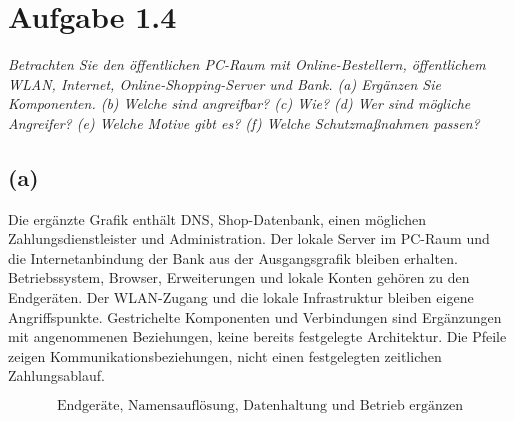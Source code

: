 \documentclass[a4paper,11pt]{article}
\newif\ifexplain
\newcommand{\aufgabe}[1]{\section*{Aufgabe #1}}
\newcommand{\angabe}[1]{\textit{#1}\par\smallskip}
\newcommand{\teil}[1]{\subsection*{(#1)}}
\newcommand{\explain}[1]{\ifexplain\begin{erklbox}#1\end{erklbox}\fi}
\newcommand{\ergebnis}[1]{\[\boxed{\text{#1}}\]}
\begin{document}
\aufgabe{1.4}
\angabe{Betrachten Sie den öffentlichen PC-Raum mit Online-Bestellern, öffentlichem WLAN, Internet,
Online-Shopping-Server und Bank. (a) Ergänzen Sie Komponenten. (b) Welche sind angreifbar?
(c) Wie? (d) Wer sind mögliche Angreifer? (e) Welche Motive gibt es? (f) Welche Schutzmaßnahmen passen?}
\teil{a}
Die ergänzte Grafik enthält DNS, Shop-Datenbank, einen möglichen Zahlungsdienstleister und Administration.
Der lokale Server im PC-Raum und die Internetanbindung der Bank aus der Ausgangsgrafik bleiben erhalten.
Betriebssystem, Browser, Erweiterungen und lokale Konten gehören zu den Endgeräten.
Der WLAN-Zugang und die lokale Infrastruktur bleiben eigene Angriffspunkte.
Gestrichelte Komponenten und Verbindungen sind Ergänzungen mit angenommenen Beziehungen, keine bereits festgelegte Architektur.
Die Pfeile zeigen Kommunikationsbeziehungen, nicht einen festgelegten zeitlichen Zahlungsablauf.
\begin{center}
\end{center}
\ergebnis{Endgeräte, Namensauflösung, Datenhaltung und Betrieb ergänzen}
\explain{Die ursprüngliche Grafik zeigt vor allem den sichtbaren Weg einer Bestellung. Wir ergänzen
Komponenten, deren Ausfall oder Missbrauch diesen Weg beeinflussen kann. Eine Datenbank oder ein
Administratorzugang muss nicht im Browser sichtbar sein, um sicherheitsrelevant zu sein.}
\end{document}
